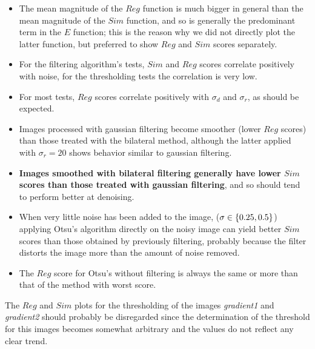 \begin{itemize}

\item The mean magnitude of the $Reg$ function is much bigger in general than the mean magnitude of the $Sim$ function, and so is generally the predominant term in the $E$ function; this is the reason why we did not directly plot the latter function, but preferred to show $Reg$ and $Sim$ scores separately.

\item For the filtering algorithm's tests, $Sim$ and $Reg$ scores correlate positively with noise, for the thresholding tests the correlation is very low. 

\item For most tests, $Reg$ scores correlate positively with $\sigma_d$ and $\sigma_r$, as should be expected. 

\item Images processed with gaussian filtering become smoother (lower $Reg$ scores) than those treated with the bilateral method, although the latter applied with $\sigma_r=20$ shows behavior similar to gaussian filtering. 

\item \textbf{Images smoothed with bilateral filtering generally have lower $Sim$ scores than those treated with gaussian filtering}, and so should tend to perform better at denoising. 


\item When very little noise has been added to the image,  ($\sigma \in \left\{ 0.25, 0.5 \right\} $) applying Otsu's algorithm directly on the noisy image can yield better $Sim$ scores than those obtained by previously filtering, probably because the filter distorts the image more than the amount of noise removed. 

\item The $Reg$ score for Otsu's without filtering is always the same or more than that of the method with worst score.

\end{itemize}

The $Reg$ and $Sim$ plots for the thresholding of the images \textit{gradient1} and \textit{gradient2} should probably be disregarded since the determination of the threshold for this images becomes somewhat arbitrary and the values do not reflect any clear trend.

